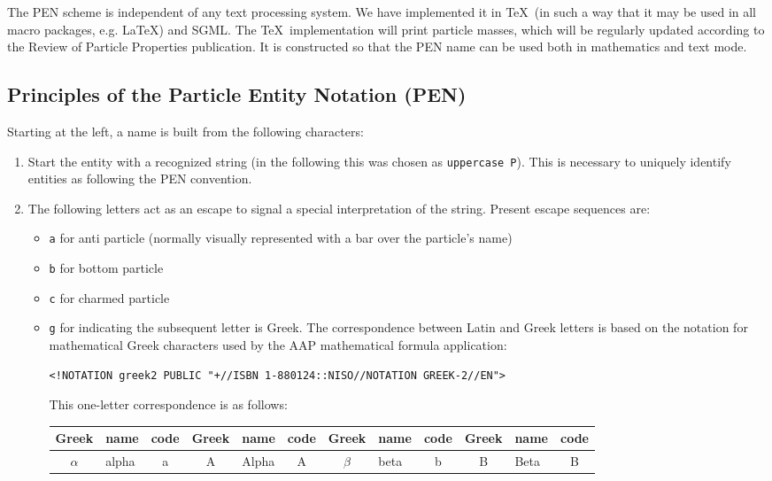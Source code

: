 \documentclass{article}
\begin{document}
The PEN scheme is independent of any text processing system.
We have implemented it in \TeX\ (in such a way that it may
be used in all macro packages, e.g. \LaTeX) and SGML.
The \TeX\ implementation will print particle masses, which will
be regularly updated according to the Review of Particle Properties
publication.
It is constructed so that the PEN name can be used both in
mathematics and text mode.
 
 
\subsection[]{Principles of the Particle Entity Notation (PEN)}
 
Starting at the left, a name is built from the following characters:
 
\begin{enumerate}
\item Start the entity with a recognized string (in the following
this was chosen as \texttt{uppercase P}). This is necessary to
uniquely identify entities as following the PEN convention.
\item The following letters act as an escape to signal a special
interpretation of the string. Present escape sequences are:
\begin{itemize}
\item \texttt{a} for anti particle (normally visually
represented with a
bar over the particle's name)
\item \texttt{b} for bottom particle
\item \texttt{c} for charmed particle
\item \texttt{g} for indicating the subsequent letter is Greek.
The correspondence between Latin and Greek letters is based on the
notation for mathematical Greek characters used by the AAP mathematical
formula application\cite{AAP}:
\begin{verbatim}
<!NOTATION greek2 PUBLIC "+//ISBN 1-880124::NISO//NOTATION GREEK-2//EN">
\end{verbatim}
This one-letter correspondence is
as follows:
\tabcolsep 3pt
\begin{center}
\begin{tabular}{*{4}{|cl>{\ttfamily}c}|}
\hline
\bf Greek & \bf name & \bf code & \bf Greek & \bf name & \bf code  &
\bf Greek & \bf name & \bf code & \bf Greek & \bf name & \bf code  \\
\hline
$\alpha$  & alpha    & a    & A         & Alpha    & A     &
$\beta$   & beta     & b    & B         & Beta     & B     \\

\end{tabular}
\end{center}
\end{itemize}
\end{enumerate}
\end{document}
